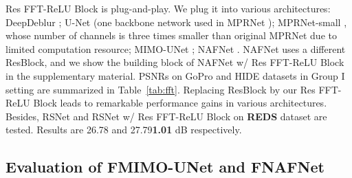 \documentclass[letterpaper]{article} \usepackage{aaai23}  \usepackage{times}  \usepackage{helvet}  \usepackage{courier}  \usepackage[hyphens]{url}  \usepackage{graphicx} \usepackage{enumitem}
\begin{document}
Res FFT-ReLU Block is plug-and-play. We plug it into various architectures: DeepDeblur \cite{Nah2017deep}; U-Net (one backbone network used in MPRNet \cite{Zamir2021multi}); MPRNet-small \cite{Zamir2021multi}, whose number of channels is three times smaller than original MPRNet due to limited computation resource; MIMO-UNet \cite{Cho2021rethinking}; NAFNet \cite{Chen2022simple}. NAFNet uses a different ResBlock, and we show the building block of NAFNet w/ Res FFT-ReLU Block in the supplementary material. 
PSNRs on GoPro and HIDE datasets in Group I setting are summarized in Table~\ref{tab:fft}. Replacing ResBlock by our Res FFT-ReLU Block leads to remarkable performance gains in various architectures. Besides, RSNet and RSNet w/ Res FFT-ReLU Block on \textbf{REDS} dataset are tested. Results are 26.78 and 27.79{\color{cyan}\textbf{\scriptsize{}1.01}} dB respectively.

\subsection{Evaluation of FMIMO-UNet and FNAFNet}
\end{document}
